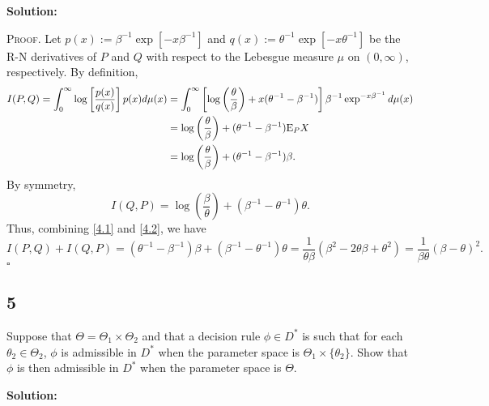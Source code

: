 \documentclass[12pt]{article}
\newcounter{ProofCounter}
\newenvironment{Proof}{\stepcounter{ProofCounter}\textsc{Proof.}}{\hfill$\square$}
\begin{document}
\textbf{Solution:}

\begin{Proof}
  Let $p(x) := \beta^{-1}\exp\left[ -x\beta^{-1} \right]$ and $q(x) := \theta^{-1}\exp\left[ -x\theta^{-1} \right]$ be the R-N derivatives of $P$ and
  $Q$ with respect to the Lebesgue measure $\mu$ on $(0,\infty)$, respectively. By definition,
  \begin{align}
    I(P,Q) = \int_{0}^{\infty}\log\left[ \frac{p(x)}{q(x)} \right]p(x)d\mu(x) & = \int_{0}^{\infty}\left[ \log\left( \frac{\theta}{\beta}\right) + 
    x(\theta^{-1} - \beta^{-1}) \right]\beta^{-1}\exp^{-x\beta^{-1}}d\mu(x) \nonumber \\
    & = \log\left( \frac{\theta}{\beta} \right) + (\theta^{-1} - \beta^{-1})\mathrm{E}_{P}X \nonumber \\
    & = \log\left( \frac{\theta}{\beta} \right) + (\theta^{-1} - \beta^{-1})\beta. \label{4.1}
  \end{align}
  By symmetry,
  \begin{equation}
    I(Q,P) = \log\left( \frac{\beta}{\theta} \right) + (\beta^{-1} - \theta^{-1})\theta.
    \label{4.2}
  \end{equation}
  Thus, combining \eqref{4.1} and \eqref{4.2}, we have 
  \[ 
    I(P,Q) + I(Q,P) = (\theta^{-1} - \beta^{-1})\beta + (\beta^{-1} - \theta^{-1})\theta = \frac{1}{\theta\beta}(\beta^{2} - 2\theta\beta +
    \theta^{2}) = \frac{1}{\beta\theta}(\beta - \theta)^{2}.
  \]
\end{Proof}


\subsection*{5}
\begin{tcolorbox}
  Suppose that $\Theta = \Theta_1 \times \Theta_2$ and that a decision rule $\phi \in D^*$ is such that for each $\theta_2\in\Theta_2$, $\phi$
  is admissible in $D^*$ when the parameter space is $\Theta_1\times \{\theta_2\}$.  Show that $\phi$ is then admissible in $D^*$ when the parameter space is $\Theta$.
\end{tcolorbox}
\textbf{Solution:} 
\end{document}
